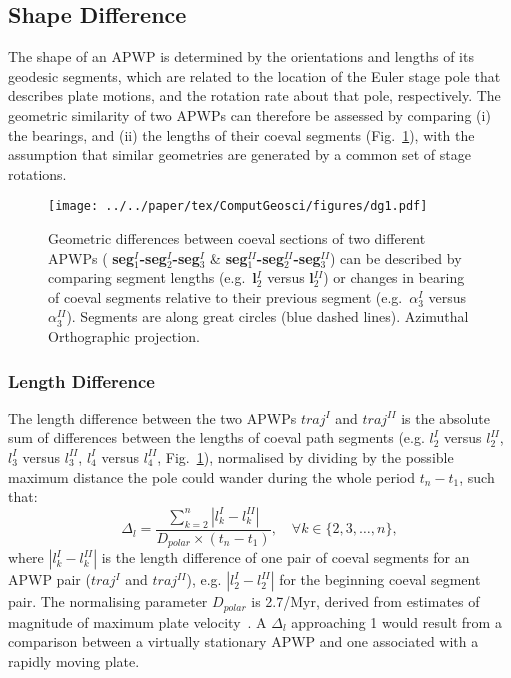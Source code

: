 \subsection{Shape Difference}

The shape of an APWP is determined by the orientations and lengths of its
geodesic segments, which are related to the location of the Euler stage pole
that describes plate motions, and the rotation rate about that pole,
respectively. The geometric similarity of two APWPs can therefore be assessed
by comparing (i) the bearings, and (ii) the lengths of their coeval segments
(Fig.~\ref{fig:direcdiff}), with the assumption that similar geometries are
generated by a common set of stage rotations.

\begin{figure}[tbp]
  \texttt{[image: ../../paper/tex/ComputGeosci/figures/dg1.pdf]}
  \caption[Geometric difference definition between two APWPs]{Geometric
    differences between coeval sections of two different APWPs ({\bf
    seg$_1^I$-seg$_2^I$-seg$_3^I$} \& {\bf seg$_1^{II}$-seg$_2^{II}$-seg$_3^{II}$})
    can be described by comparing segment lengths (e.g.\ {\bf l$_2^I$} versus
    {\bf l$_2^{II}$}) or changes in bearing of coeval segments relative to their
    previous segment (e.g.\ {\bf $\alpha_3^I$} versus {\bf $\alpha_3^{II}$}).
    Segments are along great circles (blue dashed lines). Azimuthal Orthographic
    projection.}\label{fig:direcdiff}
\end{figure}

\subsubsection{Length Difference}
The length difference between the two APWPs $traj^I$ and $traj^{II}$ is the
absolute sum of differences between the lengths of coeval path segments (e.g.
$l_2^I$ versus $l_2^{II}$, $l_3^I$ versus $l_3^{II}$, $l_4^I$ versus $l_4^{II}$,
Fig.~\ref{fig:direcdiff}), normalised by dividing by the possible maximum
distance the pole could wander during the whole period $t_n-t_1$, such that:
%
\begin{equation*}
  \Delta_l = \frac{\sum\limits_{k=2}^n | l_k^I - l_k^{II} |}{D_{polar}\times(t_n-t_1)} ,
  \quad\forall k \in \{2,3,\ldots,n\},
\label{eq:ld}
\end{equation*}
%
where $|l_k^I - l_k^{II}|$ is the length difference of one pair of coeval
segments for an APWP pair ($traj^I$ and $traj^{II}$), e.g. $|l_2^I - l_2^{II}|$
for the beginning coeval segment pair. The normalising parameter $D_{polar}$ is
2.7\degree/Myr, derived from estimates of magnitude of maximum plate
velocity~\cite[up to about 30 cm/year]{S09,K14}. A $\Delta_l$ approaching 1
would result from a comparison between a virtually stationary APWP and one
associated with a rapidly moving plate.

